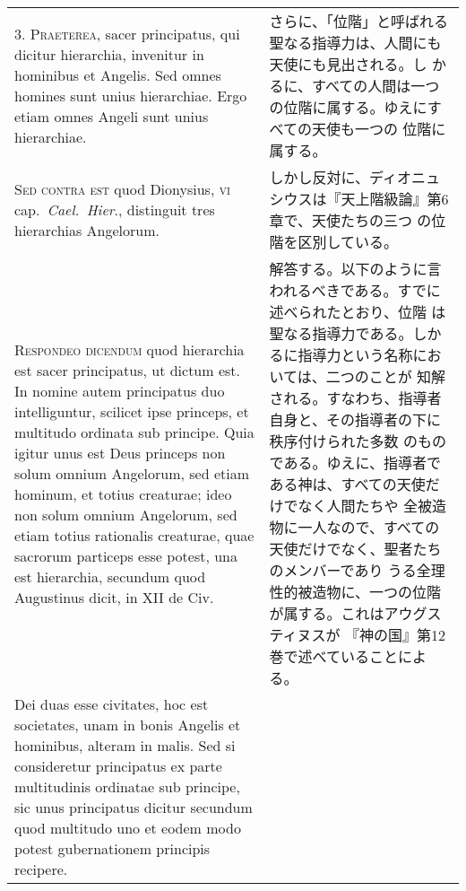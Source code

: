 \documentclass[10pt]{jsarticle} %
\begin{document}
\begin{longtable}{p{21em}p{21em}}
3. {\scshape Praeterea}, sacer principatus, qui dicitur hierarchia, invenitur in
hominibus et Angelis. Sed omnes homines sunt unius hierarchiae. Ergo
etiam omnes Angeli sunt unius hierarchiae.

&

さらに、「位階」と呼ばれる聖なる指導力は、人間にも天使にも見出される。し
かるに、すべての人間は一つの位階に属する。ゆえにすべての天使も一つの
位階に属する。

\\



{\scshape Sed contra est} quod Dionysius, {\scshape vi} cap.~{\itshape Cael.~Hier}., distinguit tres
hierarchias Angelorum.

&

しかし反対に、ディオニュシウスは『天上階級論』第6章で、天使たちの三つ
の位階を区別している。

\\


{\scshape Respondeo dicendum} quod hierarchia est sacer principatus, ut dictum
est. In nomine autem principatus duo intelliguntur, scilicet ipse
princeps, et multitudo ordinata sub principe. Quia igitur unus est
Deus princeps non solum omnium Angelorum, sed etiam hominum, et totius
creaturae; ideo non solum omnium Angelorum, sed etiam totius
rationalis creaturae, quae sacrorum particeps esse potest, una est
hierarchia, secundum quod Augustinus dicit, in XII de Civ. 


&

解答する。以下のように言われるべきである。すでに述べられたとおり、位階
は聖なる指導力である。しかるに指導力という名称においては、二つのことが
知解される。すなわち、指導者自身と、その指導者の下に秩序付けられた多数
のものである。ゆえに、指導者である神は、すべての天使だけでなく人間たちや
全被造物に一人なので、すべての天使だけでなく、聖者たちのメンバーであり
うる全理性的被造物に、一つの位階が属する。これはアウグスティヌスが
『神の国』第12巻で述べていることによる。



\\


Dei duas esse civitates, hoc est societates, unam in bonis Angelis et
hominibus, alteram in malis. Sed si consideretur principatus ex parte
multitudinis ordinatae sub principe, sic unus principatus dicitur
secundum quod multitudo uno et eodem modo potest gubernationem
principis recipere.


&


\\



\end{longtable}
\end{document}
